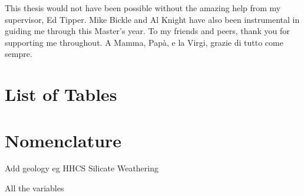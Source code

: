 \documentclass[hidelinks, 12pt]{article} %
\begin{document}
This thesis would not have been possible without the amazing help from my supervisor, Ed Tipper. Mike Bickle and Al Knight have also been instrumental in guiding me through this Master's year. To my friends and peers, thank you for supporting me throughout. A Mamma, Papà, e la Virgi, grazie di tutto come sempre.


\newpage

\thispagestyle{empty}

\section*{List of Tables}

\newpage

\thispagestyle{empty}

\section*{Nomenclature}

Add geology eg HHCS
Silicate Weathering 

All the variables

\newpage




\FloatBarrier
{}





\newpage




\newpage





\newpage





\newpage





\newpage

\nocite{*}

 

\newpage


\end{document}
